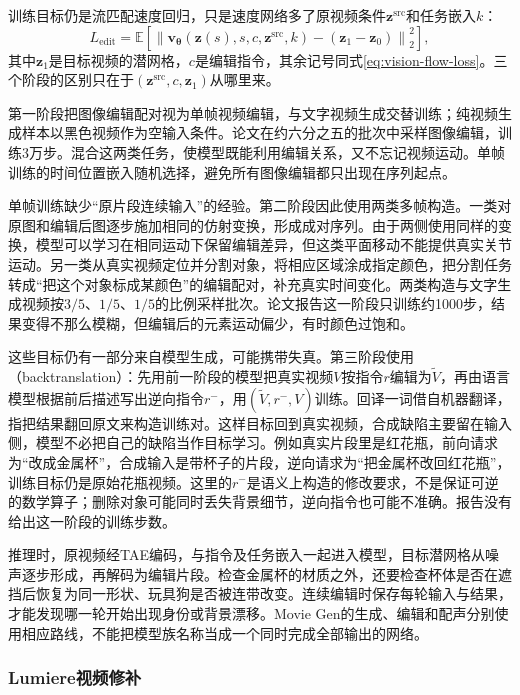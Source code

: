 训练目标仍是流匹配速度回归，只是速度网络多了原视频条件$\bm z^{\mathrm{src}}$和任务嵌入$k$：
\begin{equation}
  L_{\mathrm{edit}}
  =\mathbb E
   \left[
    \left\lVert
     \bm v_{\bm\theta}(\bm z(s),s,c,\bm z^{\mathrm{src}},k)
     -(\bm z_1-\bm z_0)
    \right\rVert_2^2
   \right],
  \label{eq:vision-edit-objective}
\end{equation}
其中$\bm z_1$是目标视频的潜网格，$c$是编辑指令，其余记号同式\eqref{eq:vision-flow-loss}。三个阶段的区别只在于$(\bm z^{\mathrm{src}},c,\bm z_1)$从哪里来。

第一阶段把图像编辑配对视为单帧视频编辑，与文字视频生成交替训练；纯视频生成样本以黑色视频作为空输入条件。论文在约六分之五的批次中采样图像编辑，训练3万步。混合这两类任务，使模型既能利用编辑关系，又不忘记视频运动。单帧训练的时间位置嵌入随机选择，避免所有图像编辑都只出现在序列起点。

单帧训练缺少“原片段连续输入”的经验。第二阶段因此使用两类多帧构造。一类对原图和编辑后图逐步施加相同的仿射变换，形成成对序列。由于两侧使用同样的变换，模型可以学习在相同运动下保留编辑差异，但这类平面移动不能提供真实关节运动。另一类从真实视频定位并分割对象，将相应区域涂成指定颜色，把分割任务转成“把这个对象标成某颜色”的编辑配对，补充真实时间变化。两类构造与文字生成视频按$3/5$、$1/5$、$1/5$的比例采样批次。论文报告这一阶段只训练约1000步，结果变得不那么模糊，但编辑后的元素运动偏少，有时颜色过饱和。

这些目标仍有一部分来自模型生成，可能携带失真。第三阶段使用（backtranslation）：先用前一阶段的模型把真实视频$V$按指令$r$编辑为$\widetilde V$，再由语言模型根据前后描述写出逆向指令$r^{-}$，用$(\widetilde V,r^{-},V)$训练。回译一词借自机器翻译，指把结果翻回原文来构造训练对。这样目标回到真实视频，合成缺陷主要留在输入侧，模型不必把自己的缺陷当作目标学习。例如真实片段里是红花瓶，前向请求为“改成金属杯”，合成输入是带杯子的片段，逆向请求为“把金属杯改回红花瓶”，训练目标仍是原始花瓶视频。这里的$r^{-}$是语义上构造的修改要求，不是保证可逆的数学算子；删除对象可能同时丢失背景细节，逆向指令也可能不准确。报告没有给出这一阶段的训练步数。

推理时，原视频经TAE编码，与指令及任务嵌入一起进入模型，目标潜网格从噪声逐步形成，再解码为编辑片段。检查金属杯的材质之外，还要检查杯体是否在遮挡后恢复为同一形状、玩具狗是否被连带改变。连续编辑时保存每轮输入与结果，才能发现哪一轮开始出现身份或背景漂移。Movie Gen的生成、编辑和配声分别使用相应路线，不能把模型族名称当成一个同时完成全部输出的网络。

\subsubsection{Lumiere视频修补}
\label{sec:vision-multigen-video-inpainting}

